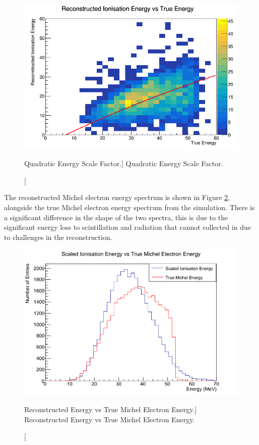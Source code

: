 \begin{figure}
	\centering
	\includegraphics[width=\textwidth]{figures/reco_v_true.png}
	\caption
	[Quadratic Energy Scale Factor.]
	{Quadratic Energy Scale Factor.}
	\label{fig:quadratic_fit}
\end{figure}

The reconstructed Michel electron energy spectrum is shown in Figure
\ref{fig:reco_v_mich}, alongside the true Michel electron energy spectrum from
the simulation. There is a significant difference in the shape of the two
spectra, this is due to the significant energy loss to scintillation and
radiation that cannot collected in \protodune{} due to challenges in the
reconstruction. 
\begin{figure}
	\centering
	\includegraphics[width=\textwidth, height=0.68\textwidth]{figures/reco_v_mich.png}
	\caption
	[Reconstructed Energy vs True Michel Electron Energy.]
	{Reconstructed Energy vs True Michel Electron Energy.}
	\label{fig:reco_v_mich}
\end{figure}

